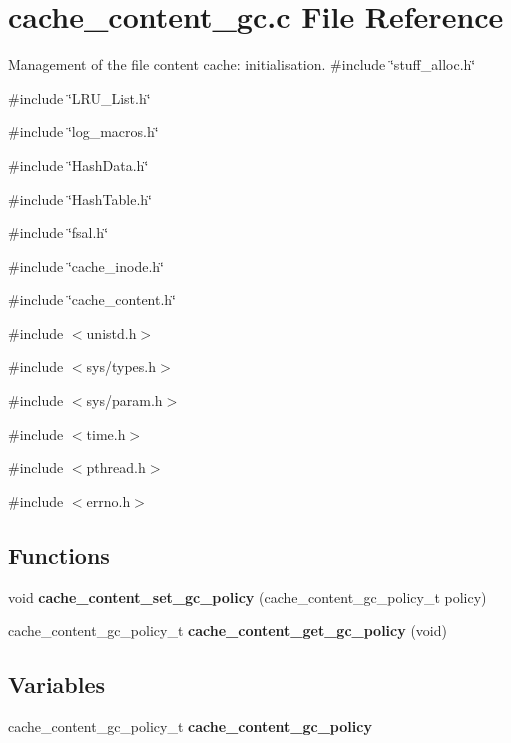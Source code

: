 \section{cache\_\-content\_\-gc.c File Reference}
\label{cache__content__gc_8c}


Management of the file content cache: initialisation.  
{\ttfamily \#include \char`\"{}stuff\_\-alloc.h\char`\"{}}\par
{\ttfamily \#include \char`\"{}LRU\_\-List.h\char`\"{}}\par
{\ttfamily \#include \char`\"{}log\_\-macros.h\char`\"{}}\par
{\ttfamily \#include \char`\"{}HashData.h\char`\"{}}\par
{\ttfamily \#include \char`\"{}HashTable.h\char`\"{}}\par
{\ttfamily \#include \char`\"{}fsal.h\char`\"{}}\par
{\ttfamily \#include \char`\"{}cache\_\-inode.h\char`\"{}}\par
{\ttfamily \#include \char`\"{}cache\_\-content.h\char`\"{}}\par
{\ttfamily \#include $<$unistd.h$>$}\par
{\ttfamily \#include $<$sys/types.h$>$}\par
{\ttfamily \#include $<$sys/param.h$>$}\par
{\ttfamily \#include $<$time.h$>$}\par
{\ttfamily \#include $<$pthread.h$>$}\par
{\ttfamily \#include $<$errno.h$>$}\par
\subsection*{Functions}
\begin{DoxyCompactItemize}
\item 
void {\bf cache\_\-content\_\-set\_\-gc\_\-policy} (cache\_\-content\_\-gc\_\-policy\_\-t policy)
\item 
cache\_\-content\_\-gc\_\-policy\_\-t {\bf cache\_\-content\_\-get\_\-gc\_\-policy} (void)
\end{DoxyCompactItemize}
\subsection*{Variables}
\begin{DoxyCompactItemize}
\item 
cache\_\-content\_\-gc\_\-policy\_\-t {\bf cache\_\-content\_\-gc\_\-policy}
\end{DoxyCompactItemize}



